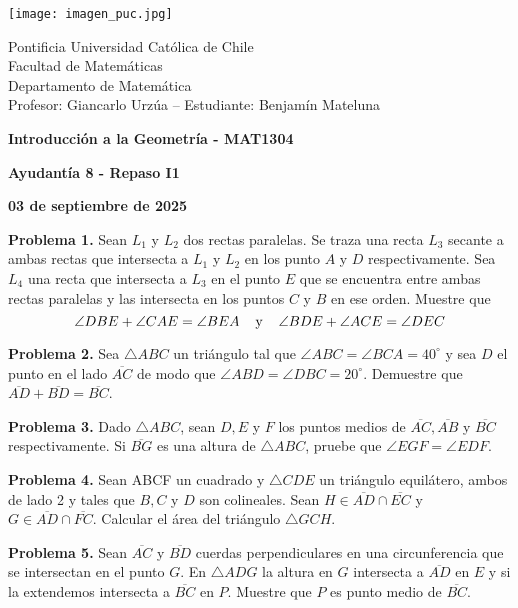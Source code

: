 \documentclass{article}
\begin{document}
\begin{minipage}{2.5cm}
    \texttt{[image: imagen\_puc.jpg]}
\end{minipage}
\begin{minipage}{14cm}
    {\sc Pontificia Universidad Católica de Chile\\
    Facultad de Matemáticas\\
    Departamento de Matemática\\
    Profesor: Giancarlo Urzúa -- Estudiante: Benjamín Mateluna}
\end{minipage}
\vspace{1ex}

{\centerline{\bf Introducción a la Geometría - MAT1304}
\centerline{\bf Ayudantía 8 - Repaso I1}}
\centerline{\bf 03 de septiembre de 2025}

\vspace{1cm}
\noindent\textbf{Problema 1.} Sean $L_{1}$ y $L_{2}$ dos rectas paralelas. Se traza una recta 
$L_{3}$ secante a ambas rectas que intersecta a $L_{1}$ y $L_{2}$ en los punto $A$ y $D$ 
respectivamente. Sea $L_{4}$ una recta que intersecta a $L_{3}$ en el punto $E$ que se encuentra 
entre ambas rectas paralelas y las intersecta en los puntos $C$ y $B$ en ese orden. Muestre que
\begin{equation*}
    \angle DBE+\angle CAE=\angle BEA \hspace{4mm}\text{y}\hspace{4mm} \angle BDE+\angle ACE=\angle DEC
\end{equation*}

\vspace{5mm}
\noindent\textbf{Problema 2.} Sea $\triangle ABC$ un triángulo tal que $\angle ABC=\angle BCA
=40^{\circ}$ y sea $D$ el punto en el lado $\overline{AC}$ de modo que $\angle ABD=\angle DBC
=20^{\circ}$. Demuestre que $\overline{AD}+\overline{BD}=\overline{BC}$.

\vspace{5mm}
\noindent\textbf{Problema 3.} Dado $\triangle ABC$, sean $D,E$ y $F$ los puntos medios de 
$\overline{AC}, \overline{AB}$ y $\overline{BC}$ respectivamente. Si $\overline{BG}$ es una altura 
de $\triangle ABC$, pruebe que $\angle EGF=\angle EDF$.

\vspace{5mm}
\noindent\textbf{Problema 4.} Sean ABCF un cuadrado y $\triangle CDE$ un triángulo equilátero,
ambos de lado 2 y tales que $B,C$ y $D$ son colineales. Sean $H\in\overline{AD}\cap\overline{EC}$ 
y $G\in\overline{AD}\cap\overline{FC}$. Calcular el área del triángulo $\triangle GCH$.

\vspace{5mm}
\noindent\textbf{Problema 5.} Sean $\overline{AC}$ y $\overline{BD}$ cuerdas perpendiculares en 
una circunferencia que se intersectan en el punto $G$. En $\triangle ADG$ la altura en $G$ 
intersecta a $\overline{AD}$ en $E$ y si la extendemos intersecta a $\overline{BC}$ en $P$. 
Muestre que $P$ es punto medio de $\overline{BC}$.
\end{document}
